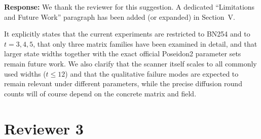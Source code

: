 \documentclass[preprint, 11pt]{article}
\newcounter{reviewerid}
\newcounter{reviewercounter}[reviewerid]
\begin{document}
\begin{enumerate}[leftmargin=1.5em, itemsep=1.2em]
    \textbf{Response:}
    We thank the reviewer for this suggestion. A dedicated ``Limitations and Future Work'' paragraph has been added (or expanded) in Section~V.

    It explicitly states that the current experiments are restricted to BN254 and to \(t=3,4,5\), that only three matrix families have been examined in detail, and that larger state widths together with the exact official Poseidon2 parameter sets remain future work.
    We also clarify that the scanner itself scales to all commonly used widths (\(t\le 12\)) and that the qualitative failure modes are expected to remain relevant under different parameters, while the precise diffusion round counts will of course depend on the concrete matrix and field.

\end{enumerate}

\vspace{2em}

\setcounter{reviewercounter}{0}
\setcounter{reviewerid}{3}
\section*{Reviewer 3}
\end{document}
